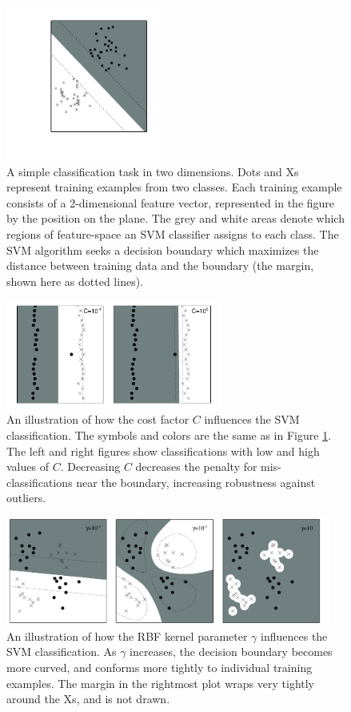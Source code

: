 \begin{figure}
\includegraphics[height=2in]{svm_ex}
\caption{A simple classification task in two dimensions. Dots and Xs represent training examples from two classes. Each training example consists of a 2-dimensional feature vector, represented in the figure by the position on the plane. The grey and white areas denote which regions of feature-space an SVM classifier assigns to each class. The SVM algorithm seeks a decision boundary which maximizes the distance between training data and the boundary (the margin, shown here as dotted lines).}
\label{fig:svm}
\end{figure}

\begin{figure}
\includegraphics[height=1.4in]{svm_c}
\caption{An illustration of how the cost factor $C$ influences the SVM classification. The symbols and colors are the same as in Figure \ref{fig:svm}. The left and right figures show classifications with low and high values of $C$. Decreasing $C$ decreases the penalty for mis-classifications near the boundary, increasing robustness against outliers. }
\label{fig:svm_c}
\end{figure}

\begin{figure}
\includegraphics[height=1.4in]{svm_islands}
\caption{An illustration of how the RBF kernel parameter $\gamma$ influences the SVM classification. As $\gamma$ increases, the decision boundary becomes more curved, and conforms more tightly to individual training examples. The margin in the rightmost plot wraps very tightly around the Xs, and is not drawn.}
\label{fig:svm_gamma}
\end{figure}




